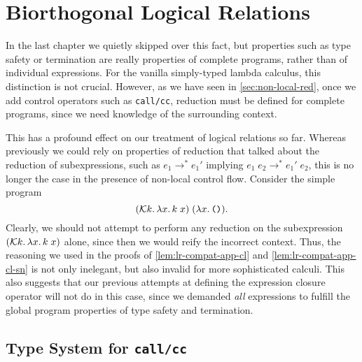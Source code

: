 \chapter{Biorthogonal Logical Relations}

In the last chapter we quietly skipped over this fact, but properties such
as type safety or termination are really properties of complete programs,
rather than of individual expressions. For the vanilla simply-typed lambda
calculus, this distinction is not crucial. However, as we have seen in
\autoref{sec:non-local-red}, once we add control operators such as
\texttt{call/cc}, reduction must be defined for complete programs, since we
need knowledge of the surrounding context.

This has a profound effect on our treatment of logical relations so far.
Whereas previously we could rely on properties of reduction that talked
about the reduction of subexpressions, such as $e_1 \longrightarrow^* e_1'$
implying $e_1\;e_2 \longrightarrow^* e_1'\;e_2$, this is no longer the case in
the presence of non-local control flow. Consider the simple program
\[
  (\mathcal{K} k\ldotp \lambda x\ldotp k\;x)\;(\lambda x\ldotp \texttt{()}).
\]
Clearly, we should not attempt to perform any reduction on the subexpression
$(\mathcal{K} k\ldotp \lambda x\ldotp k\;x)$ alone, since then we would
reify the incorrect context. Thus, the reasoning we used in the proofs of
\autoref{lem:lr-compat-app-cl} and \autoref{lem:lr-compat-app-cl-sn} is not
only inelegant, but also invalid for more sophisticated calculi.
This also suggests that our previous attempts at defining the expression
closure operator will not do in this case, since we demanded \emph{all}
expressions to fulfill the global program properties of type safety and
termination.

\section{Type System for \texttt{call/cc}}

